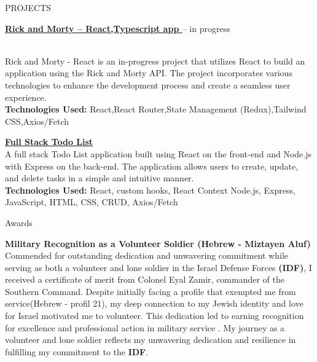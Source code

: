 \documentclass{resume}
\begin{document}
    \begin{rSection}{PROJECTS}
        \begin{itemize}
            \item \textbf{\href{https://github.com/Asnvir/React-TS-RickMorty}{Rick and Morty – React,Typescript app }}– in progress {\\Rick and Morty - React is an in-progress project that utilizes React to build an application using the Rick and Morty API. The project incorporates various technologies to enhance the development process and create a seamless user experience.\\
            \textbf{Technologies Used:}  React,React Router,State Management (Redux),Tailwind CSS,Axios/Fetch

            \vspace{0.25em} %
            \item \textbf{{\href{https://github.com/Asnvir/todo-react-app}{Full Stack Todo List }}}{\\A full stack Todo List application built using React on the front-end and Node.js with Express on the back-end. The application allows users to create, update, and delete tasks in a simple and intuitive manner.\\
            \textbf{Technologies Used:} React, custom hooks, React Context Node.js, Express, JavaScript, HTML, CSS, CRUD, Axios/Fetch}
            }
        \end{itemize}
    \end{rSection}


    \begin{rSection}{Awards}
        \vspace{-1.25em}
        \item \textbf{Military Recognition as a Volunteer Soldier (Hebrew - Miztayen Aluf)}
        \\Commended for outstanding dedication and unwavering commitment while serving as
        both a volunteer and lone soldier in the Israel Defense Forces \textbf{(IDF)}, I received a
        certificate of merit from Colonel Eyal Zamir, commander of the Southern Command.
        Despite initially facing a profile that exempted me from service(Hebrew - profil 21), my deep
        connection to my Jewish identity and love for Israel motivated me to volunteer. This
        dedication led to earning recognition for excellence and professional action in military
        service . My journey as a volunteer and lone soldier reflects my unwavering dedication
        and resilience in fulfilling my commitment to the \textbf{IDF}.
    \end{rSection}
\end{document}
